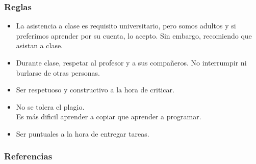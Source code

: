 \documentclass{beamer}
\begin{document}
\begin{frame}

\frametitle{Reglas}

\begin{itemize}
\item{La asistencia a clase es requisito universitario, pero
somos adultos y si preferimos aprender por su cuenta, lo acepto.
Sin embargo, recomiendo que asistan a clase.}
\item{Durante clase, respetar al profesor y a sus compa\~neros.
No interrumpir ni burlarse de otras personas.}
\item{Ser respetuoso y constructivo a la hora de criticar.}
\item{No se tolera el plagio.
\\\small{Es m\'as dificil aprender a copiar que aprender a programar.}}
\item{Ser puntuales a la hora de entregar tareas.}
\end{itemize}
\end{frame}

\begin{frame}
\frametitle{Referencias}


\end{frame}
\end{document}
